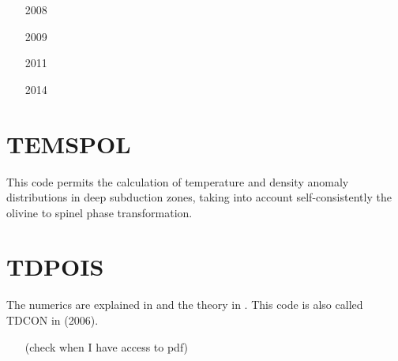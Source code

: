 \begin{small}
\begin{itemize}
\item[2008]
\textcite{vanv08}
\item[2009]
\textcite{vale09}
\item[2011]
\textcite{vanj11}
\item[2014]
\textcite{vanb14}
\end{itemize}
\end{small}

\section{TEMSPOL} 
This code permits the calculation of temperature and density anomaly 
distributions in deep subduction zones, taking into account self-consistently 
the olivine to spinel phase transformation.

\begin{small}
\begin{itemize}
\item[\twothousandfour]  
\textcite{nevc04}
\item[\twothousandfive]  
\textcite{canv05}
\end{itemize}
\end{small}

\section{TDPOIS} 

The numerics are explained in \cite{hous87} and the theory in \cite{hous90}.
This code is also called TDCON in \textcite{cosc06} (2006).

\begin{small}
\begin{itemize}
\item[\nineteeneightyseven]\textcite{hous87}
\item[\nineteenninety] \textcite{hous90} \textcite{hous90b}
\item[\nineteenninetyfive] \textcite{schh95} (check when I have access to pdf)
\item[\nineteenninetysix] \textcite{schh96}
\item[\twothousandtwo] \textcite{scbh02}
\item[\twothousandfour] \textcite{scbh04}
\item[\twothousandsix] \textcite{cosc06}
\end{itemize}
\end{small}


